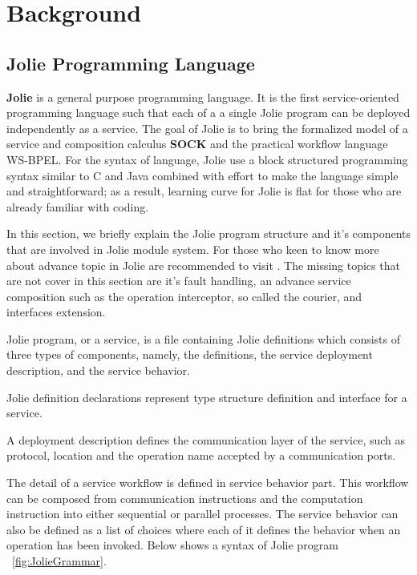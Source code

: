 \chapter{Background}

\section{Jolie Programming Language}

\textbf{Jolie}\cite{JOLIE} is a general purpose programming language.
It is the first service-oriented programming language such that each of a a single Jolie program can be deployed independently as a service.
The goal of Jolie is to bring the formalized model of a service and composition calculus \textbf{SOCK} \cite{10.1007/11948148-27} and the practical workflow language WS-BPEL\cite{BPEL2007}.
For the syntax of language, Jolie use a block structured programming syntax similar to C and Java combined with effort to make the language simple and straightforward; as a result, learning curve for Jolie is flat for those who are already familiar with coding.

In this section, we briefly explain the Jolie program structure and it's components that are involved in Jolie module system. For those who keen to know more about advance topic in Jolie are recommended to visit \cite{joliedoc, JOLIE}. The missing topics that are not cover in this section are it's fault handling, an advance service composition such as the operation interceptor, so called the courier, and interfaces extension.

Jolie program, or a service, is a file containing Jolie definitions which consists of three types of components, namely, the definitions, the service deployment description, and the service behavior.

Jolie definition declarations represent type structure definition and interface for a service.

A deployment description defines the communication layer of the service, such as protocol, location and the operation name accepted by a communication ports.

The detail of a service workflow is defined in service behavior part. This workflow can be composed from communication instructions and the computation instruction into either sequential or parallel processes.
The service behavior can also be defined as a list of choices where each of it defines the behavior when an operation has been invoked. Below shows a syntax of Jolie program ~\ref{fig:JolieGrammar}.

